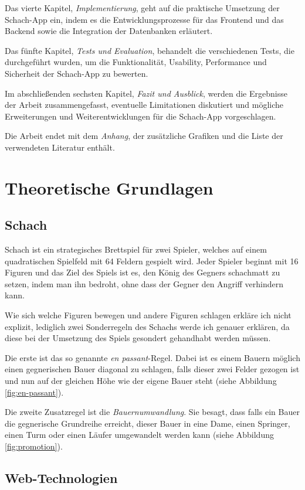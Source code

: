 \documentclass[a4paper,12pt]{report}
\begin{document}
Das vierte Kapitel, \textit{Implementierung}, geht auf die praktische Umsetzung der Schach-App ein, indem es die Entwicklungsprozesse für das Frontend und das Backend sowie die Integration der Datenbanken erläutert.

Das fünfte Kapitel, \textit{Tests und Evaluation}, behandelt die verschiedenen Tests, die durchgeführt wurden, um die Funktionalität, Usability, Performance und Sicherheit der Schach-App zu bewerten.

Im abschließenden sechsten Kapitel, \textit{Fazit und Ausblick}, werden die Ergebnisse der Arbeit zusammengefasst, eventuelle Limitationen diskutiert und mögliche Erweiterungen und Weiterentwicklungen für die Schach-App vorgeschlagen.

Die Arbeit endet mit dem \textit{Anhang}, der zusätzliche Grafiken und die Liste der verwendeten Literatur enthält.
\chapter{Theoretische Grundlagen}
    \section{Schach}
   Schach ist ein strategisches Brettspiel für zwei Spieler, welches auf einem quadratischen Spielfeld mit 64 Feldern gespielt wird. Jeder Spieler beginnt mit 16 Figuren und das Ziel des Spiels ist es, den König des Gegners schachmatt zu setzen, indem man ihn bedroht, ohne dass der Gegner den Angriff verhindern kann. 
   
   Wie sich welche Figuren bewegen und andere Figuren schlagen erkläre ich nicht explizit, lediglich zwei Sonderregeln des Schachs werde ich genauer erklären, da diese bei der Umsetzung des Spiels gesondert gehandhabt werden müssen.
   
   Die erste ist das so genannte \textit{en passant}-Regel. Dabei ist es einem Bauern möglich einen gegnerischen Bauer diagonal zu schlagen, falls dieser zwei Felder gezogen ist und nun auf der gleichen Höhe wie der eigene Bauer steht (siehe Abbildung \ref{fig:en-passant}).
   
   Die zweite Zusatzregel ist die \textit{Bauernumwandlung}. Sie besagt, dass falls ein Bauer die gegnerische Grundreihe erreicht, dieser Bauer in eine Dame, einen Springer, einen Turm oder einen Läufer umgewandelt werden kann (siehe Abbildung \ref{fig:promotion}).
    \section{Web-Technologien}
\end{document}

